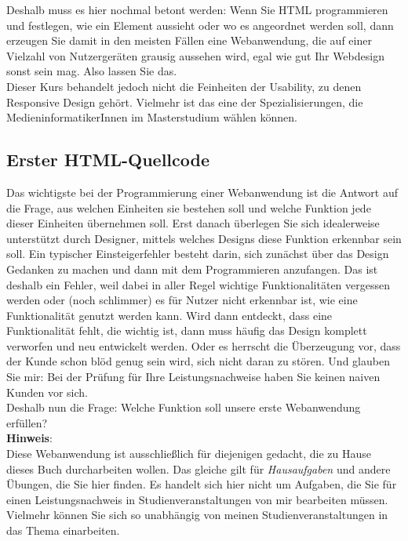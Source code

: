 Deshalb muss es hier nochmal betont werden: Wenn Sie HTML programmieren und festlegen, wie ein Element aussieht oder wo es angeordnet werden soll, dann erzeugen Sie damit in den meisten Fällen eine Webanwendung, die auf einer Vielzahl von Nutzergeräten grausig aussehen wird, egal wie gut Ihr Webdesign sonst sein mag. Also lassen Sie das.\\

Dieser Kurs behandelt jedoch nicht die Feinheiten der Usability, zu denen Responsive Design gehört. Vielmehr ist das eine der Spezialisierungen, die MedieninformatikerInnen im Masterstudium wählen können.

\subsection{Erster HTML-Quellcode}

Das wichtigste bei der Programmierung einer Webanwendung ist die Antwort auf die Frage, aus welchen Einheiten sie bestehen soll und welche Funktion jede dieser Einheiten übernehmen soll. Erst danach überlegen Sie sich idealerweise unterstützt durch Designer, mittels welches Designs diese Funktion erkennbar sein soll. Ein typischer Einsteigerfehler besteht darin, sich zunächst über das Design Gedanken zu machen und dann mit dem Programmieren anzufangen. Das ist deshalb ein Fehler, weil dabei in aller Regel wichtige Funktionalitäten vergessen werden oder (noch schlimmer) es für Nutzer nicht erkennbar ist, wie eine Funktionalität genutzt werden kann. Wird dann entdeckt, dass eine Funktionalität fehlt, die wichtig ist, dann muss häufig das Design komplett verworfen und neu entwickelt werden. Oder es herrscht die Überzeugung vor, dass der Kunde schon blöd genug sein wird, sich nicht daran zu stören. Und glauben Sie mir: Bei der Prüfung für Ihre Leistungsnachweise haben Sie keinen naiven Kunden vor sich.\\

Deshalb nun die Frage: Welche Funktion soll unsere erste Webanwendung erfüllen?\\

\textbf{Hinweis}:\\

Diese Webanwendung ist ausschließlich für diejenigen gedacht, die zu Hause dieses Buch durcharbeiten wollen. Das gleiche gilt für \emph{Hausaufgaben} und andere Übungen, die Sie hier finden. Es handelt sich hier nicht um Aufgaben, die Sie für einen Leistungsnachweis in Studienveranstaltungen von mir bearbeiten müssen. Vielmehr können Sie sich so unabhängig von meinen Studienveranstaltungen in das Thema einarbeiten.\\

